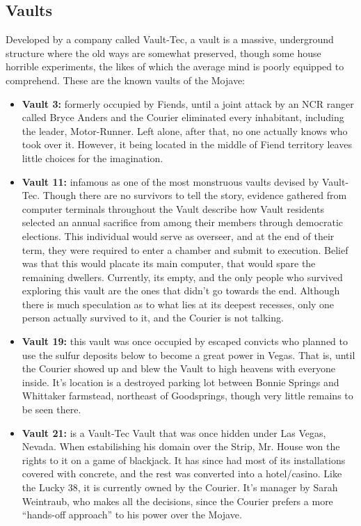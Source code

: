 \subsection{Vaults}

Developed by a company called Vault-Tec, a vault is a massive, underground structure where the old ways are somewhat preserved, though some house horrible experiments, the likes of which the average mind is poorly equipped to comprehend. These are the known vaults of the Mojave:

\begin{itemize}
	\item \textbf{Vault 3:} formerly occupied by Fiends, until a joint attack by an NCR ranger called Bryce Anders and the Courier eliminated every inhabitant, including the leader, Motor-Runner. Left alone, after that, no one actually knows who took over it. However, it being located in the middle of Fiend territory leaves little choices for the imagination.
	
	\item \textbf{Vault 11:} infamous as one of the most monstruous vaults devised by Vault-Tec. Though there are no survivors to tell the story, evidence gathered from computer terminals throughout the Vault describe how Vault residents selected an annual sacrifice from among their members through democratic elections. This individual would serve as overseer, and at the end of their term, they were required to enter a chamber and submit to execution. Belief was that this would placate its main computer, that would spare the remaining dwellers. Currently, its empty, and the only people who survived exploring this vault are the ones that didn't go towards the end. Although there is much speculation as to what lies at its deepest recesses, only one person actually survived to it, and the Courier is not talking.
	
	\item \textbf{Vault 19:} this vault was once occupied by escaped convicts who planned to use the sulfur deposits below to become a great power in Vegas. That is, until the Courier showed up and blew the Vault to high heavens with everyone inside. It's location is a destroyed parking lot between Bonnie Springs and Whittaker farmstead, northeast of Goodsprings, though very little remains to be seen there.
	
	\item \textbf{Vault 21:} is a Vault-Tec Vault that was once hidden under Las Vegas, Nevada. When estabilishing his domain over the Strip, Mr. House won the rights to it on a game of blackjack. It has since had most of its installations covered with concrete, and the rest was converted into a hotel/casino. Like the Lucky 38, it is currently owned by the Courier. It's manager by Sarah Weintraub, who makes all the decisions, since the Courier prefers a more ``hands-off approach'' to his power over the Mojave.
	

\end{itemize}
